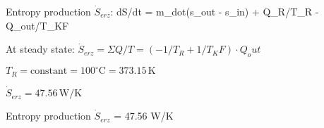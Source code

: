 Entropy production \( \dot{S}_{erz} \):  
dS/dt = m_dot(s_out - s_in) + Q_R/T_R - Q_out/T_KF  

At steady state:  
\( \dot{S}_{erz} = \Sigma Q/T = \left(-1/T_R + 1/T_KF\right) \cdot Q_out \)  

\( T_R = \text{constant} = 100^\circ \text{C} = 373.15 \, \text{K} \)  

\( \dot{S}_{erz} = 47.56 \, \text{W/K} \)  

Entropy production \( \dot{S}_{erz} \) = 47.56 W/K